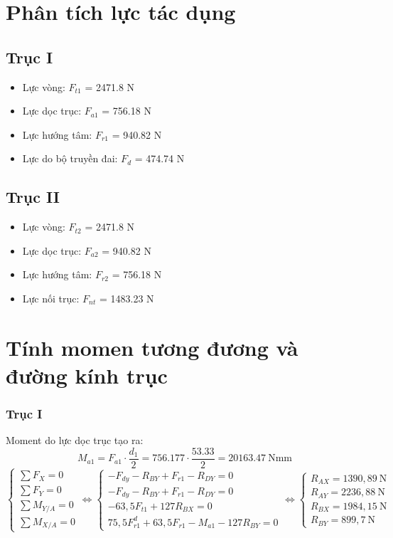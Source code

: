 \section{Phân tích lực tác dụng}
\subsection{Trục I}
\begin{itemize}
    \item Lực vòng: $F_{t1}$ = 2471.8 N
    \item Lực dọc trục: $F_{a1}$ = 756.18 N
    \item Lực hướng tâm: $F_{r1}$ = 940.82 N 
    \item Lực do bộ truyền đai: $F_d$ = 474.74 N
\end{itemize}
\subsection{Trục II}
\begin{itemize}
    \item Lực vòng: $F_{t2}$ = 2471.8 N
    \item Lực dọc trục: $F_{a2}$ = 940.82 N
    \item Lực hướng tâm: $F_{r2}$ = 756.18 N 
    \item Lực nối trục: $F_{nt}$ = 1483.23 N
\end{itemize}
\section{Tính momen tương đương và đường kính trục}
\subsubsection{Trục I}
Moment do lực dọc trục tạo ra:
\[
    M_{a1} = F_{a1} \cdot \frac{d_1}{2} 
           = 756.177 \cdot \frac{53.33}{2} 
           = 20163.47\ \text{Nmm}
\]
\[
    \left\{
    \begin{array}{l}
        \sum F_X = 0 \\
        \sum F_Y = 0 \\
        \sum M_{Y/A} = 0 \\
        \sum M_{X/A} = 0
    \end{array}
    \right.
    \Leftrightarrow
    \left\{
    \begin{array}{l}
        -F_{dy} - R_{BY} + F_{r1} - R_{DY} = 0 \\
        -F_{dy} - R_{BY} + F_{r1} - R_{DY} = 0  \\
        -63{,}5 F_{t1} + 127 R_{BX} = 0 \\
        75{,}5 F_{r1}^d + 63{,}5 F_{r1} - M_{a1} - 127 R_{BY} = 0
    \end{array}
    \right.
    \Leftrightarrow
    \left\{
    \begin{array}{l}
        R_{AX} = 1390{,}89\ \text{N} \\
        R_{AY} = 2236{,}88\ \text{N} \\
        R_{BX} = 1984{,}15\ \text{N} \\
        R_{BY} = 899{,}7\ \text{N}
    \end{array}
    \right.
\]

